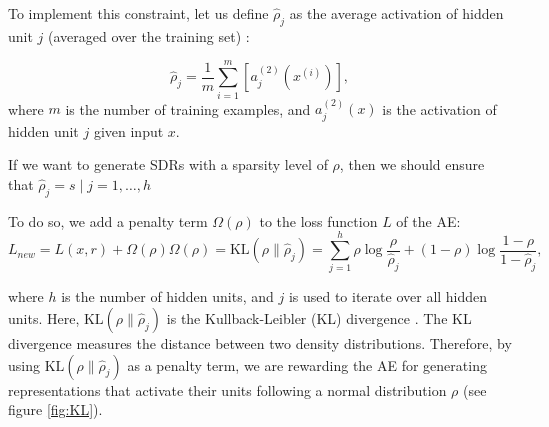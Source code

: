 \documentclass[runningheads]{llncs}
\begin{document}
To implement this constraint, let us define $\hat{\rho}_{j}$ as the average activation of hidden unit $j$ (averaged over the training set) \cite{ng2011sparse}:

\begin{equation}
    \hat{\rho}_{j}=\frac{1}{m} \sum_{i=1}^{m}\left[a_{j}^{(2)}\left(x^{(i)}\right)\right],
\end{equation}
where $m$ is the number of training examples, and $a_{j}^{(2)}\left(x\right)$ is the activation of hidden unit $j$ given input $x$.

If we want to generate SDRs with a sparsity level of $\rho$, then we should ensure that $\hat\rho_{j}=s \mid j=1, \dots,h$

To do so, we add a penalty term $\Omega(\rho)$ to the loss function $L$ of the AE:
\begin{subequations}
    \begin{equation}
        L_{new} = L(x,r) + \Omega(\rho)
    \end{equation}
    
    \begin{equation}
    \label{eqn:KLdiv}
        \Omega(\rho) = \mathrm{KL}\left(\rho \| \hat{\rho}_{j}\right) =  \sum_{j=1}^{h} \rho \log \frac{\rho}{\hat{\rho}_{j}}+(1-\rho) \log \frac{1-\rho}{1-\hat{\rho}_{j}},
    \end{equation}
\end{subequations}

where $h$ is the number of hidden units, and $j$ is used to iterate over all hidden units. Here, $\mathrm{KL}\left(\rho \| \hat{\rho}_{j}\right)$ is the  Kullback-Leibler (KL) divergence \cite{kullback1951information}. The KL divergence measures the distance between two density distributions. Therefore, by using $\mathrm{KL}\left(\rho \| \hat{\rho}_{j}\right)$ as a penalty term, we are rewarding the AE for generating representations that activate their units following a normal distribution $\rho$ (see figure \ref{fig:KL}).
\end{document}
